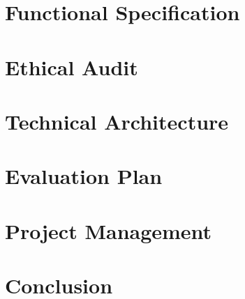 \documentclass[12pt]{report}
\begin{document}
\chapter{Functional Specification}


\chapter{Ethical Audit}


\chapter{Technical Architecture}


\chapter{Evaluation Plan}


\chapter{Project Management}


\chapter{Conclusion}


\appendix
\begin{appendices}

\end{appendices}

%


\end{document}

